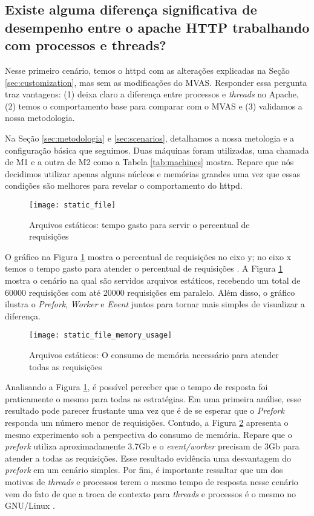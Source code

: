 \subsection{Existe alguma diferença significativa de desempenho entre o apache
HTTP trabalhando com processos e threads?}

Nesse primeiro cenário, temos o httpd com as alterações explicadas na Seção
\ref{sec:customization}, mas sem as modificações do MVAS. Responder essa
pergunta traz vantagens: (1) deixa claro a diferença entre processos e \emph{threads}
no Apache, (2) temos o comportamento base para comparar com o MVAS e (3)
validamos a nossa metodologia.



Na Seção \ref{sec:metodologia} e \ref{sec:scenarios}, detalhamos a nossa
metologia e a configuração básica que seguimos. Duas máquinas foram utilizadas,
uma chamada de M1 e a outra de M2 como a Tabela \ref{tab:machines} mostra.
Repare que nós decidimos utilizar apenas alguns núcleos e memórias grandes uma
vez que essas condições são melhores para revelar o comportamento do httpd.

\begin{figure}[!h]
  \centering
  \texttt{[image: static\_file]}

  \caption{Arquivos estáticos: tempo gasto para servir o percentual de requisições}
  \label{fig:static_file}
\end{figure}

O gráfico na Figura \ref{fig:static_file} mostra o percentual de requisições no
eixo y; no eixo x temos o tempo gasto para atender o percentual de requisições
\citep{apache_ab}. A Figura \ref{fig:static_file} mostra o cenário na qual são
servidos arquivos estáticos, recebendo um total de 60000 requisições com até
20000 requisições em paralelo. Além disso, o gráfico ilustra o \emph{Prefork},
\emph{Worker} e \emph{Event} juntos para tornar mais simples de visualizar a
diferença.

\begin{figure}[!h]
  \centering
  \texttt{[image: static\_file\_memory\_usage]}

  \caption{Arquivos estáticos: O consumo de memória necessário para atender todas as requisições}
  \label{fig:static_file_memory}
\end{figure}
 
Analisando a Figura \ref{fig:static_file}, é possível perceber que o tempo de
resposta foi praticamente o mesmo para todas as estratégias. Em uma primeira
análise, esse resultado pode parecer frustante uma vez que é de se esperar que
o \emph{Prefork} responda um número menor de requisições. Contudo, a Figura
\ref{fig:static_file_memory} apresenta o mesmo experimento sob a perspectiva do
consumo de memória. Repare que o \emph{prefork} utiliza aproximadamente 3.7Gb e
o \emph{event/worker} precisam de 3Gb para atender a todas as requisições. Esse
resultado evidência uma desvantagem do \emph{prefork} em um cenário simples.
Por fim, é importante ressaltar que um dos motivos de \emph{threads} e
processos terem o mesmo tempo de resposta nesse cenário vem do fato de que a
troca de contexto para \emph{threads} e processos é o mesmo no GNU/Linux
\citep{love}.

